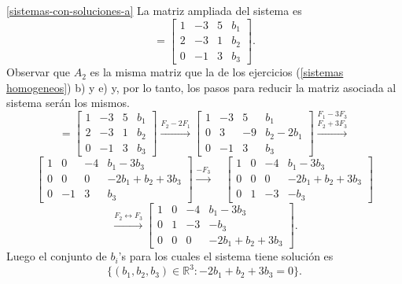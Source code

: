 \begin{enumerate}[topsep=6pt, itemsep=.4cm]
\ref{sistemas-con-soluciones-a} La matriz ampliada del sistema es  
\begin{equation*}
[A_2|Y] = \left[\begin{array}{ccc|c}
 1&-3&5&b_1\\
 2&-3&1&b_2\\
 0&-1&3&b_3\end{array}\right] .
\end{equation*}
Observar que $A_2$ es la misma matriz que la de los ejercicios (\ref{sistemas homogeneos}) b) y e) y, por lo tanto, los pasos para reducir la matriz asociada al sistema serán los mismos. 
\begin{equation*}
[A_2|Y] = 
    \left[\begin{array}{ccc|c}
        1&-3&5&b_1\\
        2&-3&1&b_2\\
        0&-1&3&b_3
    \end{array}\right] 
    \stackrel{F_2-2F_1}{\longrightarrow}   
    \left[\begin{array}{ccc|c}
        1&-3&5&b_1\\
        0&3&-9&b_2-2b_1\\
        0&-1&3&b_3
    \end{array}\right]
    \stackrel{F_1-3F_3}{\stackrel{F_2+3F_3}{\longrightarrow}}  
\end{equation*}
\begin{equation*}
    \left[\begin{array}{ccc|c}
        1&0&-4&b_1-3b_3\\
        0&0&0&-2b_1 +b_2 + 3b_3\\
        0&-1&3&b_3
    \end{array}\right] 
    \stackrel{-F_3}{\longrightarrow}  \quad
    \left[\begin{array}{ccc|c}
        1&0&-4&b_1-3b_3\\
        0&0&0&-2b_1 +b_2 + 3b_3\\
        0&1&-3&-b_3
    \end{array} \right]
\end{equation*}
\begin{equation*}
    \stackrel{F_2 \leftrightarrow F_3}{\longrightarrow}
    \left[\begin{array}{ccc|c}
        1&0&-4&b_1-3b_3\\
        0&1&-3&-b_3\\
        0&0&0&-2b_1 +b_2 + 3b_3 
    \end{array}\right].
\end{equation*}
Luego el conjunto de $b_i$'s para los cuales el sistema tiene solución es $$\{(b_1,b_2,b_3)\in \mathbb R^3: -2b_1 +b_2 + 3b_3 = 0\}.$$


\end{enumerate}

